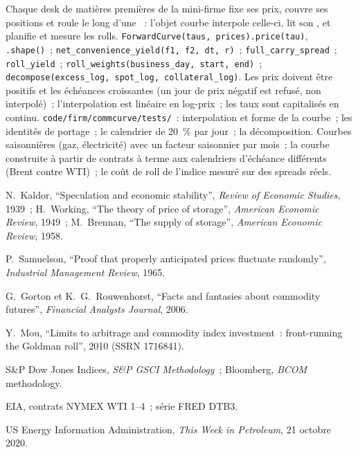 \begin{build}
 Chaque desk de matières premières de la mini-firme fixe ses prix, couvre ses positions et roule le long
d'une ~: l'objet courbe interpole celle-ci, lit son , et planifie et mesure les rolls.
 \texttt{ForwardCurve(taus, prices).price(tau)}, \texttt{.shape()}~;
\texttt{net\_convenience\_yield(f1, f2, dt, r)}~; \texttt{full\_carry\_spread}~; \texttt{roll\_yield}~;
\texttt{roll\_weights(business\_day, start, end)}~; \texttt{decompose(excess\_log, spot\_log,
collateral\_log)}.
 Les prix doivent être positifs et les échéances croissantes (un jour de prix négatif est refusé, non
interpolé)~; l'interpolation est linéaire en log-prix~; les taux sont capitalisés en continu.
 \texttt{code/firm/commcurve/tests/}~: interpolation et forme de la courbe~; les identités
de portage~; le calendrier de 20~\% par jour~; la décomposition.
 Courbes saisonnières (gaz, électricité) avec un facteur saisonnier par mois~; la courbe construite à partir de contrats à terme
aux calendriers d'échéance différents (Brent contre WTI)~; le coût de roll de l'indice mesuré sur des spreads réels.
\end{build}

\begin{omsources}
\item N.~Kaldor, ``Speculation and economic stability'', \emph{Review of Economic Studies}, 1939~;
H.~Working, ``The theory of price of storage'', \emph{American Economic Review}, 1949~;
M.~Brennan, ``The supply of storage'', \emph{American Economic Review}, 1958.
\item P.~Samuelson, ``Proof that properly anticipated prices fluctuate randomly'',
\emph{Industrial Management Review}, 1965.
\item G.~Gorton et K.~G.~Rouwenhorst, ``Facts and fantasies about commodity futures'', \emph{Financial
Analysts Journal}, 2006.
\item Y.~Mou, ``Limits to arbitrage and commodity index investment~: front-running the Goldman roll'',
2010 (SSRN 1716841).
\item S\&P Dow Jones Indices, \emph{S\&P GSCI Methodology}~; Bloomberg, \emph{BCOM} methodology.
\item EIA, contrats NYMEX WTI 1--4~; série FRED DTB3.
\item US Energy Information Administration, \emph{This Week in Petroleum}, 21 octobre 2020.
\end{omsources}

